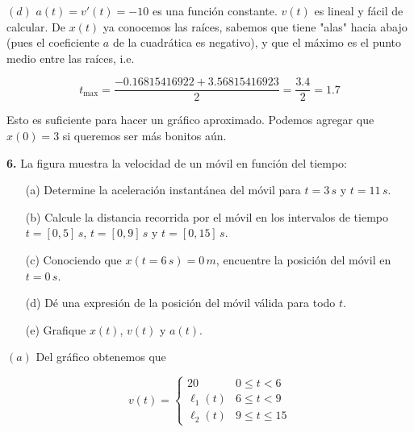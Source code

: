 \documentclass[12pt]{article}
\theoremstyle{definition}
\begin{document}
$(d)$ $a(t) = v'(t) = -10$ es una función constante. $v(t)$ es lineal y fácil de
calcular. De $x(t)$ ya conocemos las raíces, sabemos que tiene "alas" hacia
abajo (pues el coeficiente $a$ de la cuadrática es negativo), y que el máximo es
el punto medio entre las raíces, i.e. 

\begin{equation*}
    t_{\text{max}} =  \frac{ -0.16815416922 + 3.56815416923 }{2} = \frac{3.4}{2}
    = 1.7
\end{equation*}

Esto es suficiente para hacer un gráfico aproximado. Podemos agregar que $x(0) =
3$ si queremos ser más bonitos aún.

\pagebreak 

\begin{shaded}
    \textbf{6.} La figura muestra la velocidad de un móvil en función del tiempo:

\begin{center}
\end{center}

\begin{enumerate}
    \item[(a)] Determine la aceleración instantánea del móvil para $t=3\,s$ y $t=11\,s$.
    \item[(b)] Calcule la distancia recorrida por el móvil en los intervalos de tiempo $t=[0,5]\,s$, $t=[0,9]\,s$ y $t=[0,15]\,s$.
    \item[(c)] Conociendo que $x(t=6\,s)=0\,m$, encuentre la posición del móvil en $t=0\,s$.
    \item[(d)] Dé una expresión de la posición del móvil válida para todo $t$.
    \item[(e)] Grafique $x(t)$, $v(t)$ y $a(t)$.
\end{enumerate}
\end{shaded}

$(a)$ Del gráfico obtenemos que 

\begin{equation*}
    v(t) = \begin{cases}
        20 & 0 \leq t < 6\\ 
        \ell_1(t) &6 \leq t < 9 \\ 
        \ell_2(t) &9\leq t \leq 15
    \end{cases}
\end{equation*}
\end{document}

